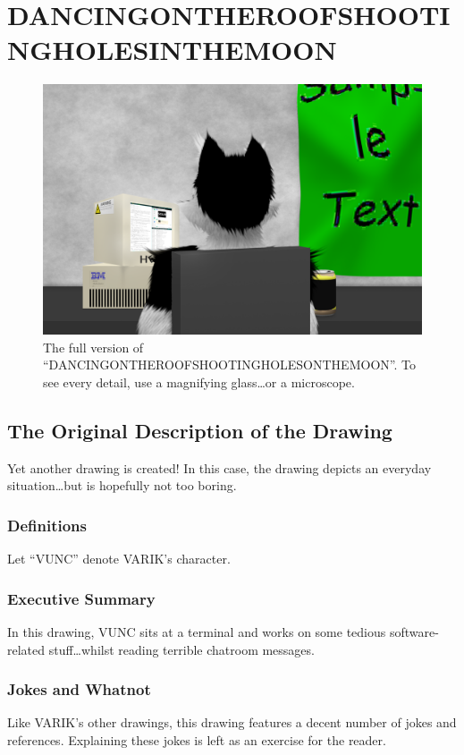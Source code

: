 \documentclass{report}
\begin{document}
\chapter{DANCINGONTHEROOFSHOOTINGHOLESINTHEMOON}
\begin{figure}[ht]
	\centering
	\includegraphics[width=\textwidth]{dancingontheroofshootingholesinthemoon/dancingontheroofshootingholesinthemoon.png}
\caption[center]{The full version of ``DANCINGONTHEROOFSHOOTINGHOLESONTHEMOON''.  To see every detail, use a magnifying glass\ldots or a microscope.}
\end{figure}
\section{The Original Description of the Drawing}
Yet another drawing is created!
In this case, the drawing depicts an everyday situation\ldots but is hopefully not too boring.

\subsection{Definitions}
Let ``VUNC'' denote VARIK's character.

\subsection{Executive Summary}
In this drawing, VUNC sits at a terminal and works on some tedious software-related stuff\ldots whilst reading terrible chatroom messages.
\subsection{Jokes and Whatnot}
Like VARIK's other drawings, this drawing features a decent number of jokes and references.  Explaining these jokes is left as an exercise for the reader.
\end{document}
